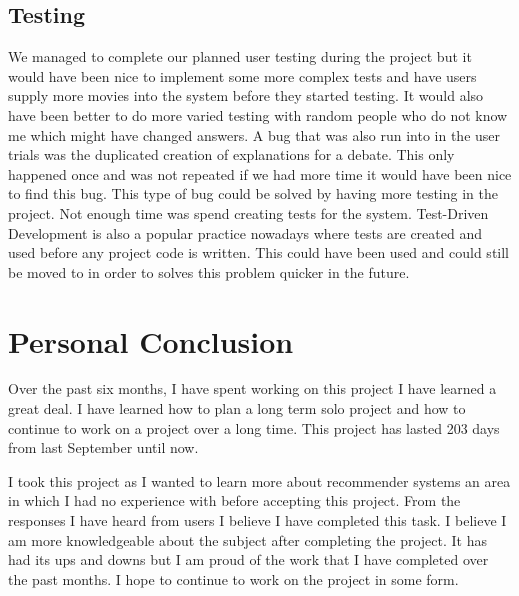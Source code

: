             
        \subsection{Testing}
            We managed to complete our planned user testing during the project but it would have been nice to implement some more complex tests and have users supply more movies into the system before they started testing. It would also have been better to do more varied testing with random people who do not know me which might have changed answers. A bug that was also run into in the user trials was the duplicated creation of explanations for a debate. This only happened once and was not repeated if we had more time it would have been nice to find this bug. This type of bug could be solved by having more testing in the project. Not enough time was spend creating tests for the system. Test-Driven Development is also a popular practice nowadays where tests are created and used before any project code is written. This could have been used and could still be moved to in order to solves this problem quicker in the future. 

        \section{Personal Conclusion}
            Over the past six months, I have spent working on this project I have learned a great deal. I have learned how to plan a long term solo project and how to continue to work on a project over a long time. This project has lasted 203 days from last September until now. 
            
            I took this project as I wanted to learn more about recommender systems an area in which I had no experience with before accepting this project. From  the responses I have heard from users I believe I have completed this task. I believe I am more knowledgeable about the subject after completing the project. It has had its ups and downs but I am proud of the work that I have completed over the past months. I hope to continue to work on the project in some form. 
            